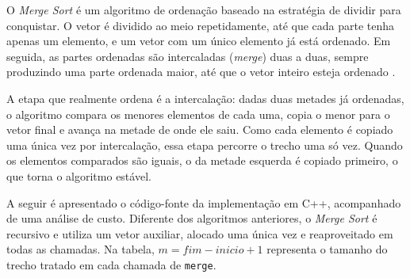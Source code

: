 \qquad O \textit{Merge Sort} é um algoritmo de ordenação baseado na estratégia de dividir para conquistar. O vetor é dividido ao meio repetidamente, até que cada parte tenha apenas um elemento, e um vetor com um único elemento já está ordenado. Em seguida, as partes ordenadas são intercaladas (\textit{merge}) duas a duas, sempre produzindo uma parte ordenada maior, até que o vetor inteiro esteja ordenado \cite{sedgewick}.

\qquad A etapa que realmente ordena é a intercalação: dadas duas metades já ordenadas, o algoritmo compara os menores elementos de cada uma, copia o menor para o vetor final e avança na metade de onde ele saiu. Como cada elemento é copiado uma única vez por intercalação, essa etapa percorre o trecho uma só vez. Quando os elementos comparados são iguais, o da metade esquerda é copiado primeiro, o que torna o algoritmo estável.

\qquad A seguir é apresentado o código-fonte da implementação em C++, acompanhado de uma análise de custo. Diferente dos algoritmos anteriores, o \textit{Merge Sort} é recursivo e utiliza um vetor auxiliar, alocado uma única vez e reaproveitado em todas as chamadas. Na tabela, $m = fim - inicio + 1$ representa o tamanho do trecho tratado em cada chamada de \texttt{merge}.

\vspace{1cm} %

